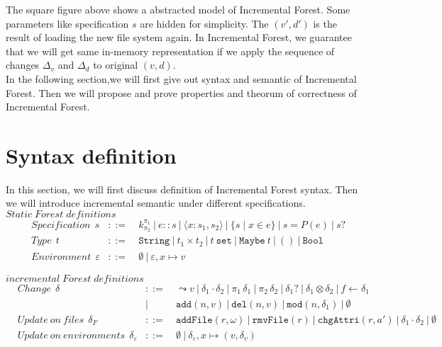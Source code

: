 \documentclass[10pt,twoside,a4paper]{article}
\theoremstyle{theorem}
\theoremstyle{lemma}
\theoremstyle{property}
\theoremstyle{definition}
\theoremstyle{assumption}
\def\fst{\pi_1}
\def\snd{\pi_2}
\begin{document}
The square figure above shows a abstracted model of Incremental Forest. Some parameters like specification $s$ are hidden for simplicity. The $(v',d')$ is the result of loading the new file system again. In Incremental Forest, we guarantee that we will get same in-memory representation if we apply the sequence of changes $\Delta_v$ and $\Delta_d$ to original $(v,d)$.\\

In the following section,we will first give out syntax and semantic of Incremental Forest. Then we will propose and prove properties and theorum of correctness of Incremental Forest.

\newpage

\section{Syntax definition}

In this section, we will first discuss definition of Incremental Forest syntax. Then we will introduce incremental semantic under different specifications.\\

$\boxed{Static\; Forest\; definitions}$
\begin{align*}
	& Specification ~~s	& ::= 	& ~k^{\pi_1}_{\pi_2} ~|~ e::s ~|~ \langle x : s_1, s_2 \rangle ~|~ \{s\mid x\in e\} ~|~ s = P(e) ~|~ s? \\
	& Type ~~t & ::= 	& ~\mathtt{String} ~|~ t_1 \times t_2 ~|~ t~\mathtt{set} ~|~ \mathtt{Maybe}~t ~|~ \mathtt{()} ~|~ \mathtt{Bool}\\
	& Environment ~~\varepsilon & ::= & ~\emptyset ~|~ \varepsilon, x\mapsto v
\end{align*}

$\boxed{incremental\;Forest\;definitions}$
\begin{align*}
	& Change ~~\delta & ::= 	& ~\leadsto v ~|~ \delta_1 \cdot \delta_2 ~|~ \fst\,\delta_1 ~|~ \snd\,\delta_2 ~|~ \delta_1? ~|~ \delta_1 \otimes \delta_2 ~|~ f \leftarrow \delta_1\\
	& 		& |		&~ \mathtt{add}(n, v) ~|~ \mathtt{del}(n, v) ~|~ \mathtt{mod}(n, \delta_1) ~|~ \emptyset\\
	& Update~on~files ~~\delta_F 	& ::= 	& ~\mathtt{addFile}(r,\omega) ~|~ \mathtt{rmvFile}(r) ~|~ \mathtt{chgAttri}(r,a') ~|~ \delta_1 \cdot \delta_2 ~|~ \emptyset\\
	& Update~on~environments ~~\delta_\varepsilon & ::= & ~\emptyset ~|~ \delta_\varepsilon, x \mapsto (v,\delta_v) \\
\end{align*}
\end{document}
